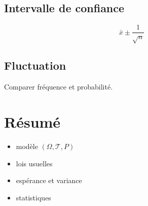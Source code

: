 \documentclass[11pt,a4paper]{article}
\begin{document}
\subsection{Intervalle de confiance}

\[
\bar{x} \pm \frac{1}{\sqrt{n}}
\]

\subsection{Fluctuation}

Comparer fréquence et probabilité.

\section{Résumé}

\begin{itemize}
\item modèle $(\Omega,\mathcal{T},P)$
\item lois usuelles
\item espérance et variance
\item statistiques
\end{itemize}
\end{document}
